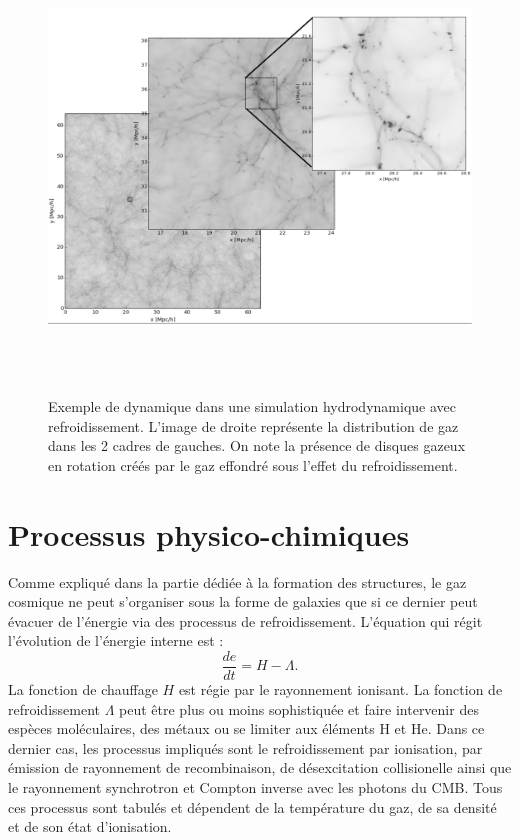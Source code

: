 \begin{figure}[htbp]
	\centering
		\includegraphics[height=12cm]{figs/zoom.png}
	\caption[Exemple de dynamique dans une simulation hydrodynamique avec refroidissement.]{Exemple de dynamique dans une simulation hydrodynamique avec refroidissement. L'image de droite représente la distribution de gaz dans les 2 cadres de gauches. On note la présence de disques gazeux en rotation créés par le gaz effondré sous l'effet du refroidissement.}
	\label{f:zoom}
\end{figure}


\section{Processus physico-chimiques}
Comme expliqué dans la partie dédiée à la formation des structures, le gaz cosmique ne peut s'organiser sous la forme de galaxies que si ce dernier peut évacuer de l'énergie via des processus de refroidissement. L'équation qui régit l'évolution de l'énergie interne est :
\begin{equation}
\frac{de}{dt}=H-\Lambda.
\end{equation}
La fonction de chauffage $H$ est régie par le rayonnement ionisant. La fonction de refroidissement $\Lambda$ peut être plus ou moins sophistiquée et faire intervenir des espèces moléculaires, des métaux  ou se limiter aux éléments H et He. Dans ce dernier cas, les processus impliqués sont le refroidissement par ionisation, par émission de rayonnement de recombinaison, de désexcitation collisionelle ainsi que le rayonnement synchrotron et Compton inverse avec les photons du CMB. Tous ces processus sont tabulés et dépendent de la température du gaz, de sa densité et de son état d'ionisation. 

